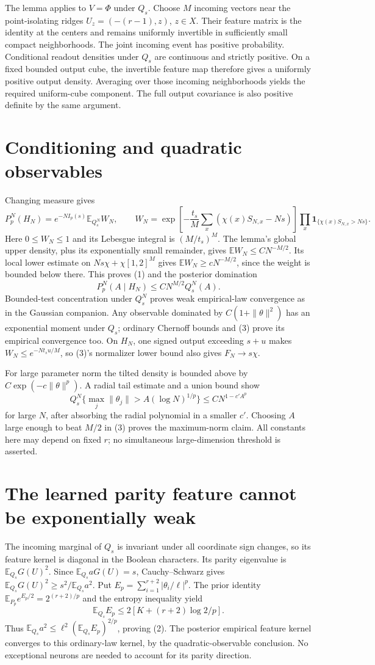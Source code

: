 \documentclass[11pt]{article}
\newcommand{\E}{\mathbb E}\newcommand{\Pp}{\mathbb P}
\newcommand{\one}{\mathbf1}
\begin{document}
The lemma applies to $V=\Phi$ under $Q_s$. Choose $M$ incoming vectors
near the point-isolating ridges
$U_z=(-(r-1),z)$, $z\in X$. Their feature matrix is the identity at
the centers and remains uniformly invertible in sufficiently small
compact neighborhoods. The joint incoming event has positive probability.
Conditional readout densities under $Q_s$ are continuous and strictly
positive. On a fixed bounded output cube, the invertible feature map
therefore gives a uniformly positive output density. Averaging over
those incoming neighborhoods yields the required uniform-cube component.
The full output covariance is also positive definite by the same argument.

\section{Conditioning and quadratic observables}
Changing measure gives
\[
 P_p^N(H_N)=e^{-NI_p(s)}\E_{Q_s^N}W_N,\qquad
 W_N=\exp\left[-\frac{t_s}{M}\sum_x(\chi(x)S_{N,x}-Ns)\right]
       \prod_x\one_{\{\chi(x)S_{N,x}>Ns\}}.
\]
Here $0\le W_N\le1$ and its Lebesgue integral is $(M/t_s)^M$.
The lemma's global upper density, plus its exponentially small remainder,
gives $\E W_N\le C N^{-M/2}$. Its local lower estimate on
$Ns\chi+\chi[1,2]^M$ gives $\E W_N\ge cN^{-M/2}$, since the weight
is bounded below there. This proves (1) and the posterior domination
\[
 P_p^N(A\mid H_N)\le C N^{M/2}Q_s^N(A).                  \tag{3}
\]
Bounded-test concentration under $Q_s^N$ proves weak empirical-law
convergence as in the Gaussian companion. Any observable dominated by
$C(1+\|\theta\|^2)$ has an exponential moment under $Q_s$; ordinary
Chernoff bounds and (3) prove its empirical convergence too.
On $H_N$, one signed output exceeding $s+u$ makes $W_N\le e^{-Nt_su/M}$,
so (3)'s normalizer lower bound also gives $F_N\to s\chi$.

For large parameter norm the tilted density is bounded above by
$C\exp(-c\|\theta\|^p)$. A radial tail estimate and a union bound show
\[
 Q_s^N\{\max_j\|\theta_j\|>A(\log N)^{1/p}\}
       \le C N^{1-c'A^p}
\]
for large $N$, after absorbing the radial polynomial in a smaller $c'$.
Choosing $A$ large enough to beat $M/2$ in (3) proves the maximum-norm
claim. All constants here may depend on fixed $r$; no simultaneous
large-dimension threshold is asserted.

\section{The learned parity feature cannot be exponentially weak}
The incoming marginal of $Q_s$ is invariant under all coordinate sign
changes, so its feature kernel is diagonal in the Boolean characters.
Its parity eigenvalue is $\E_{Q_s}G(U)^2$. Since
$\E_{Q_s}aG(U)=s$, Cauchy--Schwarz gives
$\E_{Q_s}G(U)^2\ge s^2/\E_{Q_s}a^2$.
Put $E_p=\sum_{i=1}^{r+2}|\theta_i/\ell|^p$.
The prior identity $\E_{P_p}e^{E_p/2}=2^{(r+2)/p}$ and the entropy
inequality yield
\[
 \E_{Q_s}E_p\le2[K+(r+2)\log2/p].
\]
Thus $\E_{Q_s}a^2\le\ell^2(\E_{Q_s}E_p)^{2/p}$, proving (2).
The posterior empirical feature kernel converges to this ordinary-law
kernel, by the quadratic-observable conclusion. No exceptional neurons
are needed to account for its parity direction.
\end{document}
